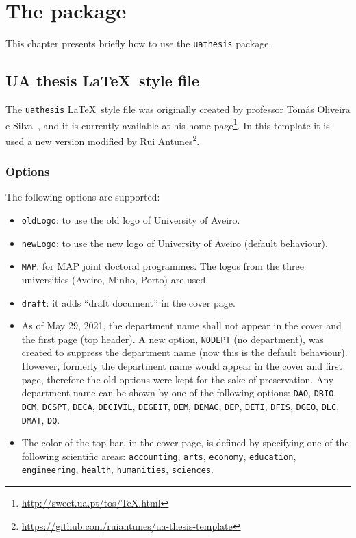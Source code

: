 \chapter{The package}
\label{c1}

This chapter presents briefly how to use the \verb+uathesis+ package.

\section{UA thesis \LaTeX\ style file}
\label{c1:s:uathesis-style-file}

The \verb+uathesis+ \LaTeX\ style file was originally created by professor Tomás Oliveira e Silva~\parencite*{silva2012a}, and it is currently available at his home page\footnote{\url{http://sweet.ua.pt/tos/TeX.html}}. In this template it is used a new version modified by Rui Antunes\footnote{\url{https://github.com/ruiantunes/ua-thesis-template}}.

\subsection{Options}
\label{c1:ss:options}

The following options are supported:

\begin{itemize}

\item
\texttt{oldLogo}: to use the old logo of University of Aveiro.

\item
\texttt{newLogo}: to use the new logo of University of Aveiro (default behaviour).

\item
\texttt{MAP}: for MAP joint doctoral programmes. The logos from the three universities (Aveiro, Minho, Porto) are used.

\item
\texttt{draft}: it adds ``draft document'' in the cover page.

\item
As of May 29, 2021, the department name shall not appear in the cover and the first page (top header). A new option, \texttt{NODEPT} (no department), was created to suppress the department name (now this is the default behaviour).\\
However, formerly the department name would appear in the cover and first page, therefore the old options were kept for the sake of preservation. Any department name can be shown by one of the following options: \texttt{DAO}, \texttt{DBIO}, \texttt{DCM}, \texttt{DCSPT}, \texttt{DECA}, \texttt{DECIVIL}, \texttt{DEGEIT}, \texttt{DEM}, \texttt{DEMAC}, \texttt{DEP}, \texttt{DETI}, \texttt{DFIS}, \texttt{DGEO}, \texttt{DLC}, \texttt{DMAT}, \texttt{DQ}.

\item
The color of the top bar, in the cover page, is defined by specifying one of the following scientific areas: \texttt{accounting}, \texttt{arts}, \texttt{economy}, \texttt{education}, \texttt{engineering}, \texttt{health}, \texttt{humanities}, \texttt{sciences}.

\end{itemize}

